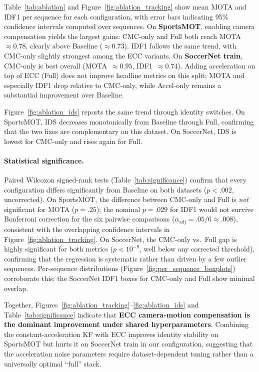 Table~\ref{tab:ablation} and Figure~\ref{fig:ablation_tracking} show mean
MOTA and IDF1 per sequence for each configuration, with error bars
indicating 95\% confidence intervals computed over sequences.
On \textbf{SportsMOT}, enabling camera compensation
yields the largest gains: CMC-only and Full both reach MOTA~$\approx 0.78$,
clearly above Baseline ($\approx 0.73$). IDF1 follows the same trend, with
CMC-only slightly strongest among the ECC variants. On
\textbf{SoccerNet train}, CMC-only is best overall (MOTA~$\approx 0.95$,
IDF1~$\approx 0.74$). Adding acceleration on top of ECC (Full) does not
improve headline metrics on this split; MOTA and especially IDF1 drop
relative to CMC-only, while Accel-only remains a substantial improvement
over Baseline.

Figure~\ref{fig:ablation_ids} reports the same trend through identity
switches. On SportsMOT, IDS decreases monotonically from Baseline through
Full, confirming that the two fixes are complementary on this dataset. On
SoccerNet, IDS is lowest for CMC-only and rises again for Full.

\paragraph{Statistical significance.}
Paired Wilcoxon signed-rank tests (Table~\ref{tab:significance}) confirm
that every configuration differs significantly from Baseline on both
datasets ($p < .002$, uncorrected). On SportsMOT, the difference between
CMC-only and Full is \emph{not} significant for MOTA ($p = .25$); the
nominal $p = .029$ for IDF1 would not survive Bonferroni correction for the
six pairwise comparisons ($\alpha_\text{adj} = .05/6 \approx .008$),
consistent with the overlapping confidence intervals in
Figure~\ref{fig:ablation_tracking}. On SoccerNet, the CMC-only vs.\ Full
gap is highly significant for both metrics ($p < 10^{-9}$, well below any
corrected threshold), confirming that the regression is systematic rather
than driven by a few outlier sequences. Per-sequence distributions
(Figure~\ref{fig:per_sequence_boxplots}) corroborate this: the SoccerNet
IDF1 boxes for CMC-only and Full show minimal overlap.

Together, Figures~\ref{fig:ablation_tracking}--\ref{fig:ablation_ids}
and Table~\ref{tab:significance} indicate that \textbf{ECC camera-motion
compensation is the dominant improvement under shared hyperparameters}.
Combining the constant-acceleration KF with ECC improves identity stability
on SportsMOT but hurts it on SoccerNet train in our configuration,
suggesting that the acceleration noise parameters require dataset-dependent
tuning rather than a universally optimal ``full'' stack.


